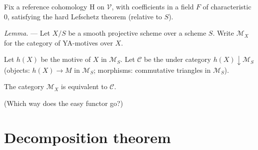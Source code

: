 \documentclass[a4paper,10pt]{article}
\newenvironment{lemma}{\textit{Lemma.} --- }{}
\def\basepieces{\mathscr{V}}
\def\coh{\mathrm{H}}
\begin{document}
Fix a reference
cohomology $\coh$ on $\basepieces$, with coefficients in a field $F$ of
characteristic $0$, satisfying the hard Lefschetz theorem (relative to $S$).

\begin{lemma} %
	Let $X/S$ be a smooth projective scheme over a scheme $S$. Write
	$\mathcal{M}_{X}$ for the category of YA-motives over $X$.

	Let $h(X)$ be the motive of $X$ in $\mathcal{M}_{S}$. Let $\mathcal{C}$
	be the under category $h(X) \downarrow \mathcal{M}_{S}$ (objects: $h(X)
	\to M$ in $\mathcal{M}_{S}$; morphisms: commutative triangles in
	$\mathcal{M}_{S}$).

	The category $\mathcal{M}_{X}$ is equivalent to $\mathcal{C}$.
	
	(Which way does the easy functor go?)
\end{lemma} %


\section{Decomposition theorem}
\end{document}
